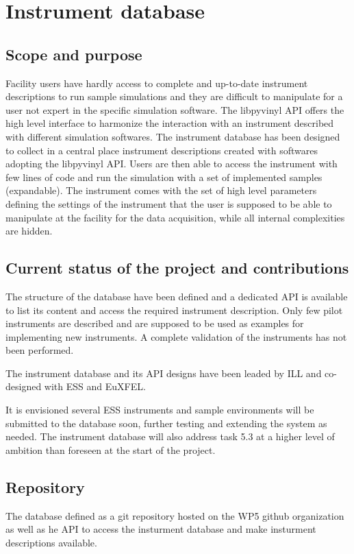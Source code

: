 \documentclass[11pt, a4paper]{article}
\begin{document}
\section{Instrument database}
\subsection{Scope and purpose}
Facility users have hardly access to complete and up-to-date instrument descriptions to run sample simulations and they are difficult to manipulate for a user not expert in the specific simulation software. 
The libpyvinyl API offers the high level interface to harmonize the interaction with an instrument described with different simulation softwares.
The instrument database has been designed to collect in a central place instrument descriptions created with softwares adopting the libpyvinyl API. Users are then able to access the instrument with few lines of code and run the simulation with a set of implemented samples (expandable). The instrument comes with the set of high level parameters defining the settings of the instrument that the user is supposed to be able to manipulate at the facility for the data acquisition, while all internal complexities are hidden.

\subsection{Current status of the project and contributions}
The structure of the database have been defined and a dedicated API is available to list its content and access the required instrument description.
Only few pilot instruments are described and are supposed to be used as examples for implementing new instruments.
A complete validation of the instruments has not been performed.

The instrument database and its API designs have been leaded by ILL and co-designed with ESS and EuXFEL.

It is envisioned several ESS instruments and sample environments will be submitted to the database soon, further testing and extending the system as needed. The instrument database will also address task 5.3 at a higher level of ambition than foreseen at the start of the project.

\subsection{Repository}
The database defined as a git repository hosted on the WP5 github organization as well as
he API to access the insturment database and make insturment descriptions available.
\end{document}
